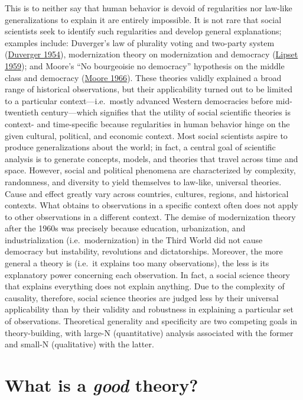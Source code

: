 \documentclass{book}
\begin{document}
This is to neither say that human behavior is devoid of regularities nor
law-like generalizations to explain it are entirely impossible. It is not rare
that social scientists seek to identify such regularities and develop general
explanations; examples include: Duverger's law of plurality voting and
two-party system
(\protect\hyperlink{ref-duvergerPoliticalPartiesTheir1954}{Duverger 1954}),
modernization theory on modernization and democracy
(\protect\hyperlink{ref-lipsetSocialRequisitesDemocracy1959}{Lipset 1959});
and Moore's ``No bourgeoisie no democracy'' hypothesis on the middle class and
democracy (\protect\hyperlink{ref-mooreSocialOriginsDictatorship1966}{Moore
1966}). These theories validly explained a broad range of historical
observations, but their applicability turned out to be limited to a particular
context---i.e.~mostly advanced Western democracies before mid-twentieth
century---which signifies that the utility of social scientific theories is
context- and time-specific because regularities in human behavior hinge on the
given cultural, political, and economic context. Most social scientists aspire
to produce generalizations about the world; in fact, a central goal of
scientific analysis is to generate concepts, models, and theories that travel
across time and space. However, social and political phenomena are
characterized by complexity, randomness, and diversity to yield themselves to
law-like, universal theories. Cause and effect greatly vary across countries,
cultures, regions, and historical contexts. What obtains to observations in a
specific context often does not apply to other observations in a different
context. The demise of modernization theory after the 1960s was precisely
because education, urbanization, and industrialization (i.e.~modernization) in
the Third World did not cause democracy but instability, revolutions and
dictatorships. Moreover, the more general a theory is (i.e.~it explains too
many observations), the less is its explanatory power concerning each
observation. In fact, a social science theory that explains everything does
not explain anything. Due to the complexity of causality, therefore, social
science theories are judged less by their universal applicability than by
their validity and robustness in explaining a particular set of observations.
Theoretical generality and specificity are two competing goals in
theory-building, with large-N (quantitative) analysis associated with the
former and small-N (qualitative) with the latter.

\hypertarget{what-is-a-good-theory}{%
\section{\texorpdfstring{What is a \emph{good}
theory?}{What is a good theory?}}\label{what-is-a-good-theory}}
\end{document}
